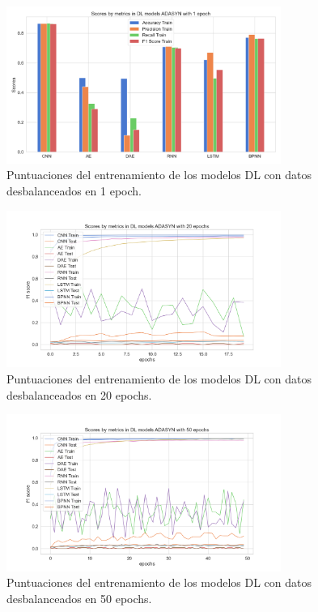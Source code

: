 \begin{figure}[h!]
	\centering
	\includegraphics[width=0.8\textwidth]{"figuras/Experimento5/ADASYN/DL_ADASYN_1_train"}
	\caption{Puntuaciones del entrenamiento de los modelos DL con datos desbalanceados en 1 epoch.}
	\label{an:23}
\end{figure}

\begin{figure}[h!]
	\centering
	\includegraphics[width=0.8\textwidth]{"figuras/Experimento5/ADASYN/DL_ADASYN_20_train"}
	\caption{Puntuaciones del entrenamiento de los modelos DL con datos desbalanceados en 20 epochs.}
	\label{an:24}
\end{figure}

\begin{figure}[h!]
	\centering
	\includegraphics[width=0.8\textwidth]{"figuras/Experimento5/ADASYN/DL_ADASYN_50_train"}
	\caption{Puntuaciones del entrenamiento de los modelos DL con datos desbalanceados en 50 epochs.}
	\label{an:25}
\end{figure}

